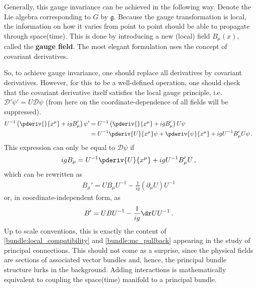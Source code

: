     Generally, this gauge invariance can be achieved in the following way. Denote the Lie algebra corresponding to $G$ by $\mathfrak{g}$. Because the gauge transformation is local, the information on how it varies from point to point should be able to propagate through space(time). This is done by introducing a new (local) field $B_\mu(x)$, called the \textbf{gauge field}. The most elegant formulation uses the concept of covariant derivatives.

    So, to achieve gauge invariance, one should replace all derivatives by covariant derivatives. However, for this to be a well-defined operation, one should check that the covariant derivative itself satisfies the local gauge principle, i.e.~$\mathcal{D}'\psi'=U\mathcal{D}\psi$ (from here on the coordinate-dependence of all fields will be suppressed).
    \begin{align}
        U^{-1}\left(\pderiv{}{x^\mu} + igB_\mu'\right)\psi' &= U^{-1}\left(\pderiv{}{x^\mu} + igB_\mu'\right)U\psi\nonumber\\
        &= U^{-1}\pderiv{U}{x^\mu}\psi + \pderiv{\psi}{x^\mu} + igU^{-1}B_\mu'U\psi\,.
    \end{align}
    This expression can only be equal to $\mathcal{D}\psi$ if
    \begin{gather}
        igB_\mu = U^{-1}\pderiv{U}{x^\mu} + igU^{-1}B_\mu'U\,,
    \end{gather}
    which can be rewritten as
    \begin{gather}
        B_\mu' = UB_\mu U^{-1} - \frac{1}{ig}(\partial_\mu U)U^{-1}
    \end{gather}
    or, in coordinate-independent form, as
    \begin{gather}
        B' = UBU^{-1} - \frac{1}{ig}\dr UU^{-1}\,.
    \end{gather}
    Up to scale conventions, this is exactly the content of \cref{bundle:local_compatibility} and \cref{bundle:mc_pullback} appearing in the study of principal connections. This should not come as a surprise, since the physical fields are sections of associated vector bundles and, hence, the principal bundle structure lurks in the background. Adding interactions is mathematically equivalent to coupling the space(time) manifold to a principal bundle.

